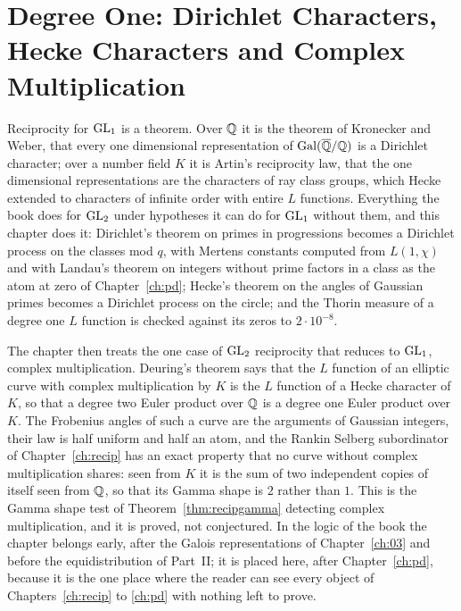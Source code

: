 \chapter[Degree One]{Degree One: Dirichlet Characters,\\ Hecke Characters and Complex Multiplication}\label{ch:gl1}

Reciprocity for $\mathrm{GL}_1$ is a theorem. Over $\mathbb{Q}$ it is the theorem of Kronecker and Weber, that every one dimensional representation of $\operatorname{Gal}(\overline{\mathbb{Q}}/\mathbb{Q})$ is a Dirichlet character; over a number field $K$ it is Artin's reciprocity law, that the one dimensional representations are the characters of ray class groups, which Hecke extended to characters of infinite order with entire $L$ functions. Everything the book does for $\mathrm{GL}_2$ under hypotheses it can do for $\mathrm{GL}_1$ without them, and this chapter does it: Dirichlet's theorem on primes in progressions becomes a Dirichlet process on the classes mod $q$, with Mertens constants computed from $L(1,\chi)$ and with Landau's theorem on integers without prime factors in a class as the atom at zero of Chapter~\ref{ch:pd}; Hecke's theorem on the angles of Gaussian primes becomes a Dirichlet process on the circle; and the Thorin measure of a degree one $L$ function is checked against its zeros to $2\cdot10^{-8}$.

The chapter then treats the one case of $\mathrm{GL}_2$ reciprocity that reduces to $\mathrm{GL}_1$, complex multiplication. Deuring's theorem says that the $L$ function of an elliptic curve with complex multiplication by $K$ is the $L$ function of a Hecke character of $K$, so that a degree two Euler product over $\mathbb{Q}$ is a degree one Euler product over $K$. The Frobenius angles of such a curve are the arguments of Gaussian integers, their law is half uniform and half an atom, and the Rankin Selberg subordinator of Chapter~\ref{ch:recip} has an exact property that no curve without complex multiplication shares: seen from $K$ it is the sum of two independent copies of itself seen from $\mathbb{Q}$, so that its Gamma shape is $2$ rather than $1$. This is the Gamma shape test of Theorem~\ref{thm:recipgamma} detecting complex multiplication, and it is proved, not conjectured. In the logic of the book the chapter belongs early, after the Galois representations of Chapter~\ref{ch:03} and before the equidistribution of Part~II; it is placed here, after Chapter~\ref{ch:pd}, because it is the one place where the reader can see every object of Chapters~\ref{ch:recip} to \ref{ch:pd} with nothing left to prove.

